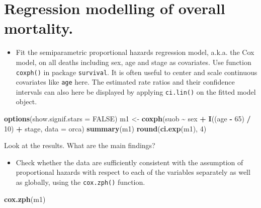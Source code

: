 \documentclass[
]{book}
\newenvironment{Shaded}{\begin{snugshade}}{\end{snugshade}}
\newcommand{\AttributeTok}[1]{\textcolor[rgb]{0.13,0.29,0.53}{#1}}
\newcommand{\ConstantTok}[1]{\textcolor[rgb]{0.56,0.35,0.01}{#1}}
\newcommand{\DecValTok}[1]{\textcolor[rgb]{0.00,0.00,0.81}{#1}}
\newcommand{\FunctionTok}[1]{\textcolor[rgb]{0.13,0.29,0.53}{\textbf{#1}}}
\newcommand{\NormalTok}[1]{#1}
\newcommand{\OtherTok}[1]{\textcolor[rgb]{0.56,0.35,0.01}{#1}}
\newcommand{\SpecialCharTok}[1]{\textcolor[rgb]{0.81,0.36,0.00}{\textbf{#1}}}
\providecommand{\tightlist}{%
  \setlength{\itemsep}{0pt}\setlength{\parskip}{0pt}}
\begin{document}
\section{Regression modelling of overall mortality.}\label{regression-modelling-of-overall-mortality.}

\begin{itemize}
\tightlist
\item
  Fit the semiparametric proportional hazards
  regression model, a.k.a. the Cox model, on all deaths including
  sex, age and stage as covariates. Use function
  \texttt{coxph()} in package \texttt{survival}.
  It is often useful to center and scale
  continuous covariates like \texttt{age} here.
  The estimated rate ratios and their confidence intervals
  can also here be displayed by applying \texttt{ci.lin()}
  on the fitted model object.
\end{itemize}

\begin{Shaded}
\begin{Highlighting}[]
\FunctionTok{options}\NormalTok{(}\AttributeTok{show.signif.stars =} \ConstantTok{FALSE}\NormalTok{)}
\NormalTok{m1 }\OtherTok{\textless{}{-}} \FunctionTok{coxph}\NormalTok{(suob }\SpecialCharTok{\textasciitilde{}}\NormalTok{ sex }\SpecialCharTok{+} \FunctionTok{I}\NormalTok{((age }\SpecialCharTok{{-}} \DecValTok{65}\NormalTok{) }\SpecialCharTok{/} \DecValTok{10}\NormalTok{) }\SpecialCharTok{+}\NormalTok{ stage, }\AttributeTok{data =}\NormalTok{ orca)}
\FunctionTok{summary}\NormalTok{(m1)}
\FunctionTok{round}\NormalTok{(}\FunctionTok{ci.exp}\NormalTok{(m1), }\DecValTok{4}\NormalTok{)}
\end{Highlighting}
\end{Shaded}

Look at the results. What are the main findings?

\begin{itemize}
\tightlist
\item
  Check whether the data are sufficiently consistent with the
  assumption of proportional hazards with respect to each of
  the variables separately
  as well as globally, using the \texttt{cox.zph()} function.
\end{itemize}

\begin{Shaded}
\begin{Highlighting}[]
\FunctionTok{cox.zph}\NormalTok{(m1)}
\end{Highlighting}
\end{Shaded}
\end{document}
